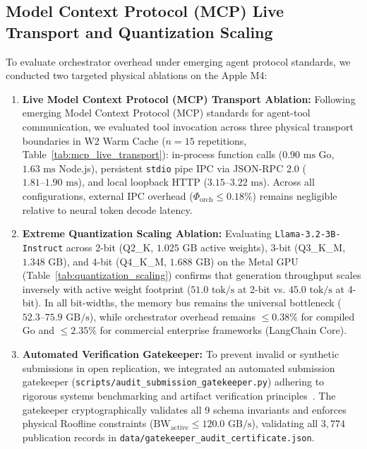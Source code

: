 \documentclass[preprint,12pt,3p]{elsarticle}
\begin{document}
\subsection{Model Context Protocol (MCP) Live Transport and Quantization Scaling}
\label{sec:mcp_and_quant}
To evaluate orchestrator overhead under emerging agent protocol standards, we conducted two targeted physical ablations on the Apple M4:
\begin{enumerate}
    \item \textbf{Live Model Context Protocol (MCP) Transport Ablation:} Following emerging Model Context Protocol (MCP) standards for agent-tool communication, we evaluated tool invocation across three physical transport boundaries in W2 Warm Cache ($n=15$ repetitions, Table~\ref{tab:mcp_live_transport}): in-process function calls ($0.90\text{ ms}$ Go, $1.63\text{ ms}$ Node.js), persistent \texttt{stdio} pipe IPC via JSON-RPC 2.0 ($1.81\text{--}1.90\text{ ms}$), and local loopback HTTP ($3.15\text{--}3.22\text{ ms}$). Across all configurations, external IPC overhead ($\Phi_{\text{orch}} \le 0.18\%$) remains negligible relative to neural token decode latency.
    \item \textbf{Extreme Quantization Scaling Ablation:} Evaluating \texttt{Llama-3.2-3B-Instruct} across 2-bit (Q2\_K, $1.025\text{ GB}$ active weights), 3-bit (Q3\_K\_M, $1.348\text{ GB}$), and 4-bit (Q4\_K\_M, $1.688\text{ GB}$) on the Metal GPU (Table~\ref{tab:quantization_scaling}) confirms that generation throughput scales inversely with active weight footprint ($51.0\text{ tok/s}$ at 2-bit vs. $45.0\text{ tok/s}$ at 4-bit). In all bit-widths, the memory bus remains the universal bottleneck ($52.3\text{--}75.9\text{ GB/s}$), while orchestrator overhead remains $\le 0.38\%$ for compiled Go and $\le 2.35\%$ for commercial enterprise frameworks (LangChain Core).
    \item \textbf{Automated Verification Gatekeeper:} To prevent invalid or synthetic submissions in open replication, we integrated an automated submission gatekeeper (\texttt{scripts/audit\_submission\_gatekeeper.py}) adhering to rigorous systems benchmarking and artifact verification principles~\cite{kalibera2013rigorous, hoefler2015scientific}. The gatekeeper cryptographically validates all 9 schema invariants and enforces physical Roofline constraints ($\text{BW}_{\text{active}} \le 120.0\text{ GB/s}$), validating all $3{,}774$ publication records in \texttt{data/gatekeeper\_audit\_certificate.json}.
\end{enumerate}
\end{document}
